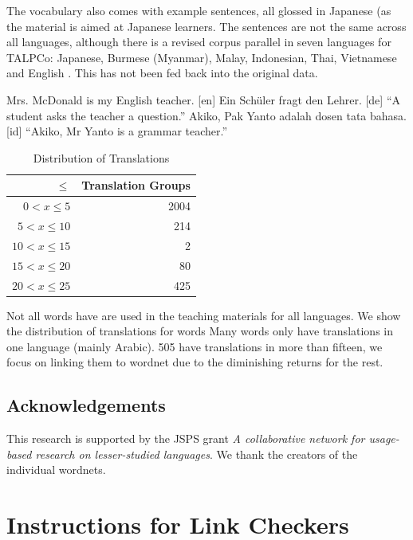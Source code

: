 \documentclass[11pt]{article}
\begin{document}
The vocabulary also comes with example sentences, all glossed in
Japanese (as the material is aimed at Japanese learners.  The
sentences are not the same across all languages, although there is a
revised corpus parallel in seven languages for TALPCo: Japanese,
Burmese (Myanmar), Malay, Indonesian, Thai, Vietnamese and English
\citep{}.   This has not been fed back into the original
data.


\begin{exe}
  \ex Mrs. McDonald is my English teacher. [en]
  \ex Ein Schüler fragt den Lehrer. [de]
  \trans ``A student asks the teacher a question.''
  \ex Akiko, Pak Yanto adalah dosen tata bahasa. [id]
  \trans ``Akiko, Mr Yanto is a grammar teacher.''
\end{exe}

\begin{table}
  \centering
  \begin{tabular}{rr}
    $\le$ & Translation Groups \\ \hline
$0 < x \le 5$ & 2004\\
$5 < x \le 10$ & 214\\
$10 < x \le 15$ & 2\\
$15 < x \le 20$ & 80\\
$20 < x \le 25$ & 425\\
  \end{tabular}
  \caption{Distribution of Translations}\label{tab:cover}
\end{table}

Not all words have are used in the teaching materials for all
languages.  We show the distribution of translations for words
  Many words only have translations in one language (mainly Arabic).
505 have translations in more than fifteen, we focus on linking them to
wordnet due to the diminishing returns for the rest.


\subsection*{Acknowledgements}

This research is supported by the JSPS grant \textit{A collaborative
  network for usage-based research on lesser-studied languages}.  We
thank the creators of the individual wordnets.




\clearpage
\onecolumn
\appendix
\section{Instructions for Link Checkers}
\end{document}
